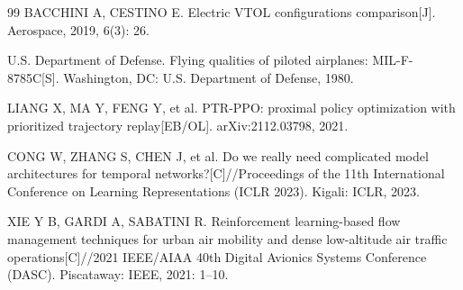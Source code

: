 \documentclass[12pt,a4paper,UTF8]{ctexart}
\begin{document}
\begin{thebibliography}{99}
 BACCHINI A, CESTINO E. Electric VTOL configurations comparison[J]. Aerospace, 2019, 6(3): 26.

 U.S. Department of Defense. Flying qualities of piloted airplanes: MIL-F-8785C[S]. Washington, DC: U.S. Department of Defense, 1980.

 LIANG X, MA Y, FENG Y, et al. PTR-PPO: proximal policy optimization with prioritized trajectory replay[EB/OL]. arXiv:2112.03798, 2021.

 CONG W, ZHANG S, CHEN J, et al. Do we really need complicated model architectures for temporal networks?[C]//Proceedings of the 11th International Conference on Learning Representations (ICLR 2023). Kigali: ICLR, 2023.

 XIE Y B, GARDI A, SABATINI R. Reinforcement learning-based flow management techniques for urban air mobility and dense low-altitude air traffic operations[C]//2021 IEEE/AIAA 40th Digital Avionics Systems Conference (DASC). Piscataway: IEEE, 2021: 1--10.

\end{thebibliography}
\end{document}
